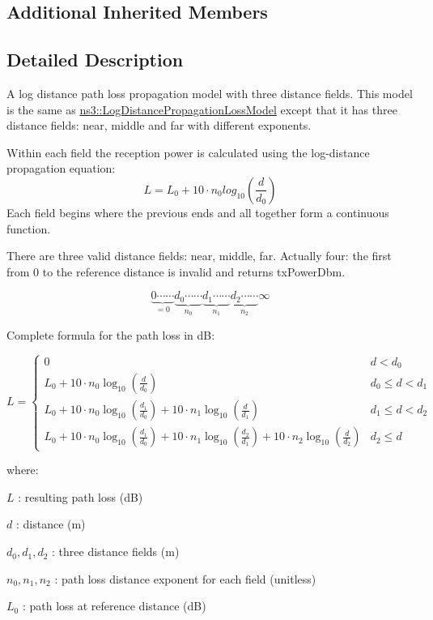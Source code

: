 \subsection*{Additional Inherited Members}


\subsection{Detailed Description}
A log distance path loss propagation model with three distance fields. This model is the same as \hyperlink{classns3_1_1LogDistancePropagationLossModel}{ns3\+::\+Log\+Distance\+Propagation\+Loss\+Model} except that it has three distance fields\+: near, middle and far with different exponents. 

Within each field the reception power is calculated using the log-\/distance propagation equation\+: \[ L = L_0 + 10 \cdot n_0 log_{10}(\frac{d}{d_0})\] Each field begins where the previous ends and all together form a continuous function.

There are three valid distance fields\+: near, middle, far. Actually four\+: the first from 0 to the reference distance is invalid and returns tx\+Power\+Dbm.

\[ \underbrace{0 \cdots\cdots}_{=0} \underbrace{d_0 \cdots\cdots}_{n_0} \underbrace{d_1 \cdots\cdots}_{n_1} \underbrace{d_2 \cdots\cdots}_{n_2} \infty \]

Complete formula for the path loss in dB\+:

\[\displaystyle L = \begin{cases} 0 & d < d_0 \\ L_0 + 10 \cdot n_0 \log_{10}(\frac{d}{d_0}) & d_0 \leq d < d_1 \\ L_0 + 10 \cdot n_0 \log_{10}(\frac{d_1}{d_0}) + 10 \cdot n_1 \log_{10}(\frac{d}{d_1}) & d_1 \leq d < d_2 \\ L_0 + 10 \cdot n_0 \log_{10}(\frac{d_1}{d_0}) + 10 \cdot n_1 \log_{10}(\frac{d_2}{d_1}) + 10 \cdot n_2 \log_{10}(\frac{d}{d_2})& d_2 \leq d \end{cases}\]

where\+:
\begin{DoxyItemize}
\item $ L $ \+: resulting path loss (dB)
\item $ d $ \+: distance (m)
\item $ d_0, d_1, d_2 $ \+: three distance fields (m)
\item $ n_0, n_1, n_2 $ \+: path loss distance exponent for each field (unitless)
\item $ L_0 $ \+: path loss at reference distance (dB)
\end{DoxyItemize}

